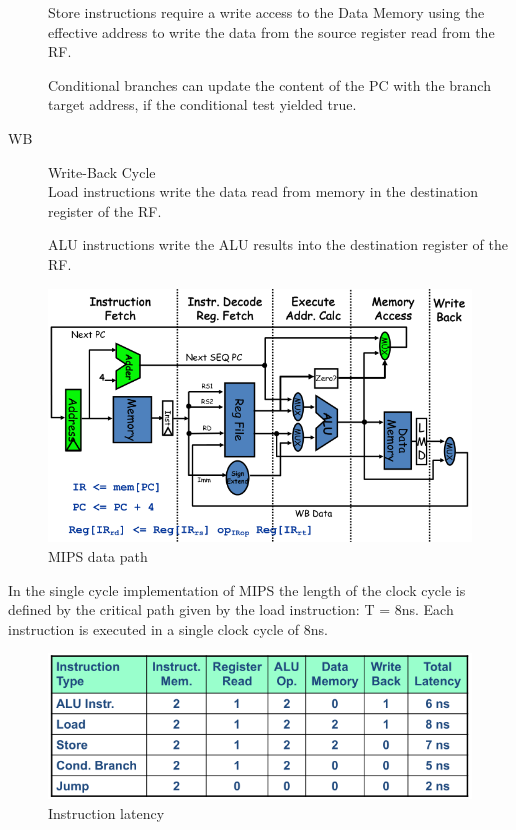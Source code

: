 \begin{description}
        Store instructions require a write access to the Data
        Memory using the effective address to write the data
        from the source register read from the RF\@.

        Conditional branches can update the content of the PC
        with the branch target address, if the conditional test
        yielded true.

    \item[WB] Write-Back Cycle\\
        Load instructions write the data read from memory in
        the destination register of the RF\@.

        ALU instructions write the ALU results into the
        destination register of the RF\@.
\end{description}


\begin{figure}[h]
    \centering
    \includegraphics[scale = 0.4]{images/MIPS-data-path}
    \caption{MIPS data path}
    \label{fig:mips-data-path}
\end{figure}

In the single cycle implementation of MIPS the length of the clock cycle is defined by the critical path given by the
load instruction: T = 8ns.
Each instruction is executed in a single clock cycle of 8ns.
\begin{figure}[h]
    \centering
    \includegraphics[scale=0.4]{images/instructions-latency}
    \caption{Instruction latency}
    \label{fig:instruction-latency}
\end{figure}

